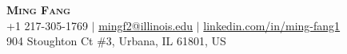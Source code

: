 \documentclass[letterpaper,11pt]{article} %
\begin{document}

% 
\begin{comment}
In Europe it is common to include a picture of ones self in the CV. Select
which heading appropriate for the document you are creating.
\end{comment}


\begin{center}
    \textbf{\Huge \scshape Ming Fang} \\ \vspace{1pt} %
    \small 
    +1 217-305-1769 $|$
    \href{mailto:mingf2@illinois.edu}{{mingf2@illinois.edu}} $|$
    \href{{https://www.linkedin.com/in/ming-fang1}}{linkedin.com/in/ming-fang1}\\ \vspace{1pt}
    {904 Stoughton Ct \#3, Urbana, IL 61801, US}
\end{center}
\end{document}
